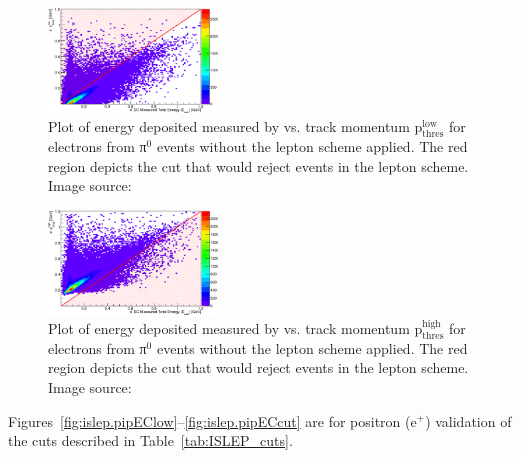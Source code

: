 \begin{figure}\begin{center}
\includegraphics[width=0.4\textwidth]{figures/lepton/Pim_EClowcut.eps}
\caption[ Deposited Energy Comparison to Track Momentum for e$^-$ Candidates]{\label{fig:islep.pimEC}Plot of energy deposited measured by  vs. track momentum p$\mathrm{_{thres}^{low}}$ for electrons from π$^0$ events without the  lepton   scheme applied. The red region depicts the cut that would reject events in the  lepton   scheme. Image source:~\cite{clas.thesis.kunkel}}
\end{center}\end{figure}

\begin{figure}\begin{center}
\includegraphics[width=0.4\textwidth]{figures/lepton/Pim_EChighcut.eps}
\caption[ Deposited Energy Comparison to Track Momentum for e$^-$ from π$^0$ Events]{\label{fig:islep.pimECcut}Plot of energy deposited measured by  vs. track momentum p$\mathrm{_{thres}^{high}}$ for electrons from π$^0$ events without the  lepton   scheme applied. The red region depicts the cut that would reject events in the  lepton   scheme. Image source:~\cite{clas.thesis.kunkel}}
\end{center}\end{figure}

Figures~\ref{fig:islep.pipEClow}--\ref{fig:islep.pipECcut} are for positron (e$^+$)  validation of the   cuts described in Table~\ref{tab:ISLEP_cuts}.


